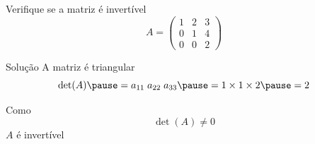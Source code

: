 \begin{question}
  Verifique se a matriz é invertível
  \[
    A =
    \begin{pmatrix}
      1 & 2 & 3 \\
      0 & 1 & 4 \\
      0 & 0 & 2
    \end{pmatrix}
  \]
\end{question}

\begin{resolution}{Solução}
  A matriz é triangular
  \pause
  \[
    \det(A)
    \pause
    = a_{11} \; a_{22} \; a_{33}
    \pause
    = 1 \times 1 \times 2
    \pause
    = 2
  \]

  \pause
  Como
  \[
    \det(A) \neq 0
  \]
  \pause
  \(A\) é invertível
\end{resolution}

\endinput




